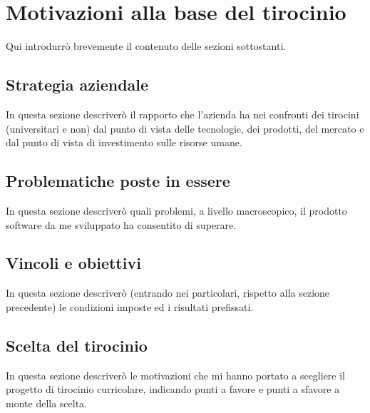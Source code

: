 \chapter{Motivazioni alla base del tirocinio}
\label{cap:motivazioni-tirocinio}
Qui introdurrò brevemente il contenuto delle sezioni sottostanti.

\section{Strategia aziendale}

In questa sezione descriverò il rapporto che l'azienda ha nei confronti dei tirocini (universitari e non) dal punto di vista delle tecnologie, dei prodotti, del mercato e dal punto di vista di investimento sulle risorse umane.

\section{Problematiche poste in essere}

In questa sezione descriverò quali problemi, a livello macroscopico, il prodotto software da me sviluppato ha consentito di superare.

\section{Vincoli e obiettivi}

In questa sezione descriverò (entrando nei particolari, rispetto alla sezione precedente) le condizioni imposte ed i risultati prefissati.

\section{Scelta del tirocinio}

In questa sezione descriverò le motivazioni che mi hanno portato a scegliere il progetto di tirocinio curricolare, indicando punti a favore e punti a sfavore a monte della scelta.